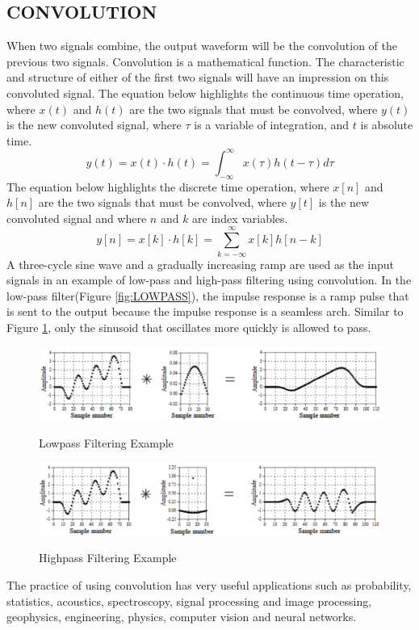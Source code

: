 \documentclass[12pt,a4paper]{article}
\begin{document}
	\subsection{CONVOLUTION}
		\normalsize
		When two signals combine, the output waveform will be the convolution of the previous two signals. Convolution is a mathematical function. The characteristic and structure of either of the first
		two signals will have an impression on this convoluted signal. The equation below highlights the continuous time operation, where $x(t)$ and $h(t)$ are the two signals that must be convolved, where 
		$y(t)$ is the new convoluted signal,  where $\tau$ is a variable of integration, and $t$ is absolute time.
				$$
					y(t) = x(t)\cdot h(t) = \int_{-\infty}^{\infty} x(\tau) h(t - \tau)d\tau 
				$$
		The equation below highlights the discrete time operation, where $x[n]$ and $h[n]$ are the two signals that must be convolved, where $y[t]$ is the new convoluted signal and where $n$ and $k$ are
		index variables.
				$$
					y[n] = x[k]\cdot h[k] = \sum_{k=-\infty}^{\infty}x[k]h[n - k]
				$$
		A three-cycle sine wave and a gradually increasing ramp are used as the input signals in an example of low-pass and high-pass filtering using convolution. In the low-pass filter(Figure \ref{fig:LOWPASS})\cite{LowPass}, the impulse response is a ramp pulse that is sent to the output because the impulse response is a seamless arch. Similar to Figure \ref{fig:HIGHPASS}, only the sinusoid that oscillates more quickly is allowed to pass.
	\begin{figure}[H]	
		\begin{center}
			\includegraphics[width=0.7\linewidth]{Lowpass_sig}
			\caption{Lowpass Filtering Example}
			\label{fig:LOWPASS}
			\includegraphics[width=0.7\linewidth]{Highpass_sig}
			\caption{Highpass Filtering Example}
			\label{fig:HIGHPASS}
		\end{center}
	\end{figure}
		The practice of using convolution has very useful applications such as probability, statistics, acoustics, spectroscopy, signal processing and image processing, geophysics, engineering, physics, computer vision and neural networks.
		\large
\newpage
\end{document}
